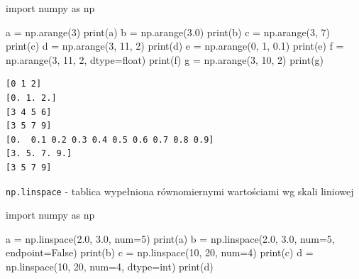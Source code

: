 \documentclass[
  polish,
  letterpaper,
  DIV=11,
  numbers=noendperiod]{scrreprt}
\newenvironment{Shaded}{\begin{snugshade}}{\end{snugshade}}
\newcommand{\BuiltInTok}[1]{\textcolor[rgb]{0.00,0.23,0.31}{#1}}
\newcommand{\DecValTok}[1]{\textcolor[rgb]{0.68,0.00,0.00}{#1}}
\newcommand{\FloatTok}[1]{\textcolor[rgb]{0.68,0.00,0.00}{#1}}
\newcommand{\ImportTok}[1]{\textcolor[rgb]{0.00,0.46,0.62}{#1}}
\newcommand{\NormalTok}[1]{\textcolor[rgb]{0.00,0.23,0.31}{#1}}
\newcommand{\OperatorTok}[1]{\textcolor[rgb]{0.37,0.37,0.37}{#1}}
\newcommand{\VariableTok}[1]{\textcolor[rgb]{0.07,0.07,0.07}{#1}}
\begin{document}
\begin{Shaded}
\begin{Highlighting}[]
\ImportTok{import}\NormalTok{ numpy }\ImportTok{as}\NormalTok{ np}

\NormalTok{a }\OperatorTok{=}\NormalTok{ np.arange(}\DecValTok{3}\NormalTok{)}
\BuiltInTok{print}\NormalTok{(a)}
\NormalTok{b }\OperatorTok{=}\NormalTok{ np.arange(}\FloatTok{3.0}\NormalTok{)}
\BuiltInTok{print}\NormalTok{(b)}
\NormalTok{c }\OperatorTok{=}\NormalTok{ np.arange(}\DecValTok{3}\NormalTok{, }\DecValTok{7}\NormalTok{)}
\BuiltInTok{print}\NormalTok{(c)}
\NormalTok{d }\OperatorTok{=}\NormalTok{ np.arange(}\DecValTok{3}\NormalTok{, }\DecValTok{11}\NormalTok{, }\DecValTok{2}\NormalTok{)}
\BuiltInTok{print}\NormalTok{(d)}
\NormalTok{e }\OperatorTok{=}\NormalTok{ np.arange(}\DecValTok{0}\NormalTok{, }\DecValTok{1}\NormalTok{, }\FloatTok{0.1}\NormalTok{)}
\BuiltInTok{print}\NormalTok{(e)}
\NormalTok{f }\OperatorTok{=}\NormalTok{ np.arange(}\DecValTok{3}\NormalTok{, }\DecValTok{11}\NormalTok{, }\DecValTok{2}\NormalTok{, dtype}\OperatorTok{=}\BuiltInTok{float}\NormalTok{)}
\BuiltInTok{print}\NormalTok{(f)}
\NormalTok{g }\OperatorTok{=}\NormalTok{ np.arange(}\DecValTok{3}\NormalTok{, }\DecValTok{10}\NormalTok{, }\DecValTok{2}\NormalTok{)}
\BuiltInTok{print}\NormalTok{(g)}
\end{Highlighting}
\end{Shaded}

\begin{verbatim}
[0 1 2]
[0. 1. 2.]
[3 4 5 6]
[3 5 7 9]
[0.  0.1 0.2 0.3 0.4 0.5 0.6 0.7 0.8 0.9]
[3. 5. 7. 9.]
[3 5 7 9]
\end{verbatim}

\texttt{np.linspace} - tablica wypełniona równomiernymi wartościami wg
skali liniowej

\begin{Shaded}
\begin{Highlighting}[]
\ImportTok{import}\NormalTok{ numpy }\ImportTok{as}\NormalTok{ np}

\NormalTok{a }\OperatorTok{=}\NormalTok{ np.linspace(}\FloatTok{2.0}\NormalTok{, }\FloatTok{3.0}\NormalTok{, num}\OperatorTok{=}\DecValTok{5}\NormalTok{)}
\BuiltInTok{print}\NormalTok{(a)}
\NormalTok{b }\OperatorTok{=}\NormalTok{ np.linspace(}\FloatTok{2.0}\NormalTok{, }\FloatTok{3.0}\NormalTok{, num}\OperatorTok{=}\DecValTok{5}\NormalTok{, endpoint}\OperatorTok{=}\VariableTok{False}\NormalTok{)}
\BuiltInTok{print}\NormalTok{(b)}
\NormalTok{c }\OperatorTok{=}\NormalTok{ np.linspace(}\DecValTok{10}\NormalTok{, }\DecValTok{20}\NormalTok{, num}\OperatorTok{=}\DecValTok{4}\NormalTok{)}
\BuiltInTok{print}\NormalTok{(c)}
\NormalTok{d }\OperatorTok{=}\NormalTok{ np.linspace(}\DecValTok{10}\NormalTok{, }\DecValTok{20}\NormalTok{, num}\OperatorTok{=}\DecValTok{4}\NormalTok{, dtype}\OperatorTok{=}\BuiltInTok{int}\NormalTok{)}
\BuiltInTok{print}\NormalTok{(d)}
\end{Highlighting}
\end{Shaded}
\end{document}
